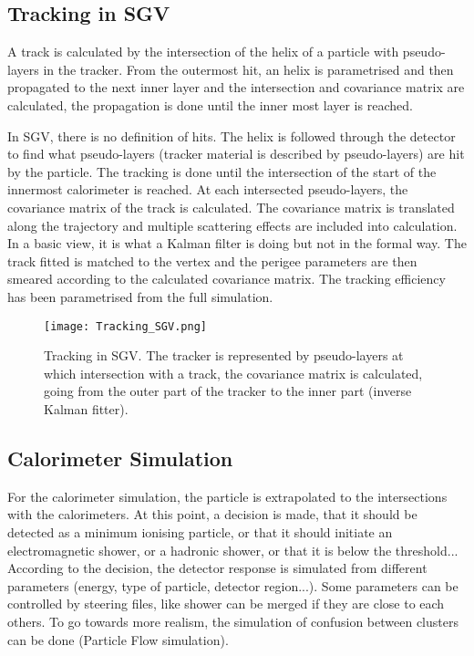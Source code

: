\documentclass[a4paper,12pt]{article}
\begin{document}
\subsection{Tracking in SGV}

A track is calculated by the intersection of the helix of a particle with pseudo-layers in the tracker. From the outermost hit, an helix is parametrised and then propagated to the next inner layer and the intersection and covariance matrix are calculated, the propagation is done until the inner most layer is reached. 

In SGV, there is no definition of hits. The helix is followed through the detector to find what pseudo-layers (tracker material is described by pseudo-layers) are hit by the particle. The tracking is done until the intersection of the start of the innermost calorimeter is reached. At each intersected pseudo-layers, the covariance matrix of the track is calculated.  The covariance matrix is translated along the trajectory and multiple scattering effects are included into calculation. 
In a basic view, it is what a Kalman filter is doing but not in the formal way. The track fitted is matched to the vertex and the perigee parameters are then smeared according to the calculated covariance matrix. The tracking efficiency has been parametrised from the full simulation.

\begin{figure}[!h]
   \centering
   \texttt{[image: Tracking\_SGV.png]} 
      \caption{Tracking in SGV. The tracker is represented by pseudo-layers at which intersection with a track, the covariance matrix is calculated, going from the outer part of the tracker to the inner part (inverse Kalman fitter).}
   \label{fig:tracking_sgv}
\end{figure}

\subsection{Calorimeter Simulation}

For the calorimeter simulation, the particle is extrapolated to the intersections with the calorimeters. At this point, a decision is made, that it should be detected as a minimum ionising particle, or that it should initiate an electromagnetic shower, or a hadronic shower, or that it is below the threshold... According to the decision, the detector response is simulated from different parameters (energy, type of particle, detector region...). Some parameters can be controlled by steering files, like shower can be merged if they are close to each others. To go towards more realism, the simulation of confusion between clusters can be done (Particle Flow simulation). 
\end{document}
